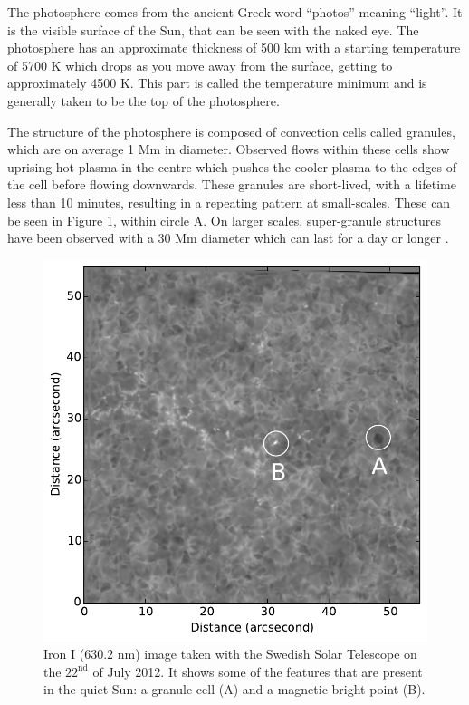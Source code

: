     The photosphere comes from the ancient Greek word ``photos'' meaning ``light''.
    It is the visible surface of the Sun, that can be seen with the naked eye.
    The photosphere has an approximate thickness of 500 km with a starting temperature of 5700 K which drops as you move away from the surface, getting to approximately 4500 K.
    This part is called the temperature minimum and is generally taken to be the top of the photosphere.

    The structure of the photosphere is composed of convection cells called granules, which are on average 1 Mm in diameter.
    Observed flows within these cells show uprising hot plasma in the centre which pushes the cooler plasma to the edges of the cell before flowing downwards. 
    These granules are short-lived, with a lifetime less than 10 minutes, resulting in a repeating pattern at small-scales.
    These can be seen in Figure \ref{fig:photosphere}, within circle A.
    On larger scales, super-granule structures have been observed with a 30 Mm diameter which can last for a day or longer \citep{lrsp-2010-2}.
   
    \begin{figure}    
    	\centering
    	\includegraphics[width=\textwidth]{QS.pdf}
    	\caption{
    		Iron I ($630.2$ nm) image taken with the Swedish Solar Telescope on the $22^{\mathrm{nd}}$ of July 2012.
    		It shows some of the features that are present in the quiet Sun: a granule cell (A) and a magnetic bright point (B).
    	}
    	\label{fig:photosphere}        
    \end{figure}   
       

